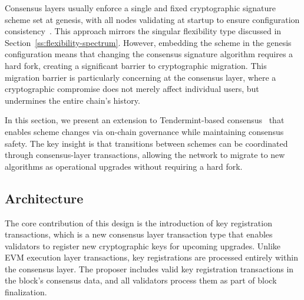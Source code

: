 

Consensus layers usually enforce a single and fixed cryptographic signature scheme set at genesis, with all nodes validating at startup to ensure configuration consistency~\cite{ETH:W14}.
This approach mirrors the singular flexibility type discussed in Section~\ref{ss:flexibility-spectrum}.
However, embedding the scheme in the genesis configuration means that changing the consensus signature algorithm requires a hard fork, creating a significant barrier to cryptographic migration.
This migration barrier is particularly concerning at the consensus layer, where a cryptographic compromise does not merely affect individual users, but undermines the entire chain's history.

In this section, we present an extension to Tendermint-based consensus~\cite{ARXIV:BKM18} that enables scheme changes via on-chain governance while maintaining consensus safety.
The key insight is that transitions between schemes can be coordinated through consensus-layer transactions, allowing the network to migrate to new algorithms as operational upgrades without requiring a hard fork.

\subsection{Architecture}\label{subsec:consensus-architecture}

The core contribution of this design is the introduction of key registration transactions, which is a new consensus layer transaction type that enables validators to register new cryptographic keys for upcoming upgrades.
Unlike EVM execution layer transactions, key registrations are processed entirely within the consensus layer.
The proposer includes valid key registration transactions in the block's consensus data, and all validators process them as part of block finalization.

